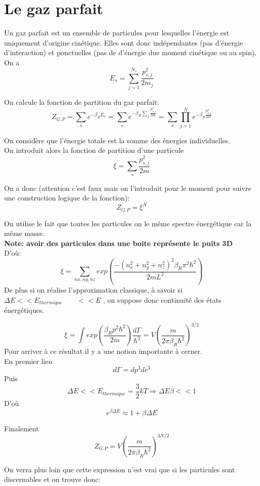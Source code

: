 \section{Le gaz parfait}


Un gaz parfait est un ensemble de particules pour lesquelles l'énergie est uniquement d'origine cinétique. Elles sont donc indépendantes (pas d'énergie d'interaction) et ponctuelles (pas de d'énergie due moment cinétique ou au spin).
On a 
$$ E_s= \sum_{j=1}^{N_s} \frac{p_{s,j}^2}{2m_j}$$

On calcule la fonction de partition du gaz parfait:
$$ Z_{G.P}= \sum_s e^{-\beta_R E_s} =\sum_s e^{-\beta_R \sum_j \frac{p_{s,j}^2}{2m}}=\sum_s \prod_{j=1}^N e^{-\beta_R \frac{p_{s,j}^2}{2m}} $$

On considère que l'énergie totale est la somme des énergies individuelles.\\

On introduit alors la fonction de partition d'une particule
$$ \xi = \sum_s \frac{p_{s,j}^2}{2m} $$

On a donc (attention c'est faux mais on l'introduit pour le moment pour suivre une construction logique de la fonction):
$$ Z_{G.P}= \xi^N $$

On utilise le fait que toutes les particules on le même spectre énergétique car la même masse.\\
\textbf{Note: avoir des particules dans une boite représente le puits 3D}\\
D'où:
$$ \xi = \sum_{nx,ny,nz} exp\left(\frac{-(n_x^2+n_y^2+n_z^2)^2 \beta_R \pi^2 \hbar^2}{2mL^2}\right) $$
De plus si on réalise l'approximation classique, à savoir si $\Delta E << E_{thermique} \qquad <<E$ , on suppose donc continuité des états énergétiques.

$$ \xi = \int exp\left(\frac{\beta_R p^2 \hbar^2}{2m}\right) \frac{d\Gamma}{\hbar^3} = V\left(\frac{m}{2 \pi \beta_R \hbar^2}\right)^{3/2}$$
Pour arriver à ce résultat il y a une notion importante à cerner.\\ En premier lieu
$$d\Gamma=dp^3dr^3$$
Puis  
$$\Delta E << E_{thermique}=\frac{3}{2}kT \Rightarrow \Delta E \beta <<1$$ 
D'où 
$$e^{\beta \Delta E} \approx 1+\beta \Delta E$$

Finalement
$$ Z_{G.P} = V\left(\frac{m}{2 \pi \beta_R \hbar^2}\right)^{3N/2}$$

On verra plus loin que cette expression n'est vrai que si les particules sont discernables et on trouve donc: \\
\begin{center}
\end{center}


